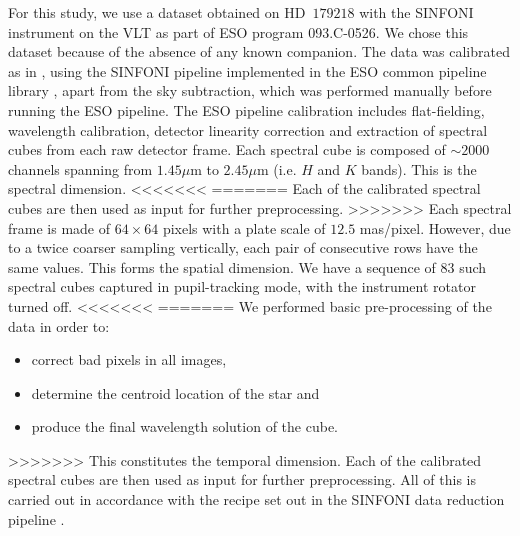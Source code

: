 \documentclass{aa}
\begin{document}
{For this study, we use a dataset obtained on HD~$179218$ with the SINFONI instrument on the VLT \citep{2004SINFONI,2003SEisenhauer} as part of ESO program 093.C-0526.
We chose this dataset because of the absence of any known companion.
The data was calibrated as in \citet{2018A&ChristiaensHD142527}, using the SINFONI pipeline implemented in the ESO common pipeline library \citep[EsoRex version 3.10.2;][]{2006Abuter}, apart from the sky subtraction, which was performed manually before running the ESO pipeline.
The ESO pipeline calibration includes flat-fielding, wavelength calibration, detector linearity correction and extraction of spectral cubes from each raw detector frame. 
Each spectral cube is composed of $\sim 2000$ channels spanning from $1.45\mu$m to $2.45 \mu$m (i.e. $H$ and $K$ bands).
This is the spectral dimension.
<<<<<<<
=======
Each of the calibrated spectral cubes are then used as input for further preprocessing.
>>>>>>>
Each spectral frame is made of $64\times64$ pixels with a plate scale of $12.5$ mas/pixel. However, due to a twice coarser sampling vertically, each pair of consecutive rows have the same values.
This forms the spatial dimension.
We have a sequence of $83$ such spectral cubes captured in pupil-tracking mode, with the instrument rotator turned off.
<<<<<<<
=======
We performed basic pre-processing of the data in order to:
\begin{itemize}
    \item correct bad pixels in all images,
    \item determine the centroid location of the star and
    \item produce the final wavelength solution of the cube. 
\end{itemize}
>>>>>>>
This constitutes the temporal dimension.
Each of the calibrated spectral cubes are then used as input for further preprocessing.
All of this is carried out in accordance with the recipe set out in the SINFONI data reduction pipeline \citep{2006Abuter}.

}
\end{document}
